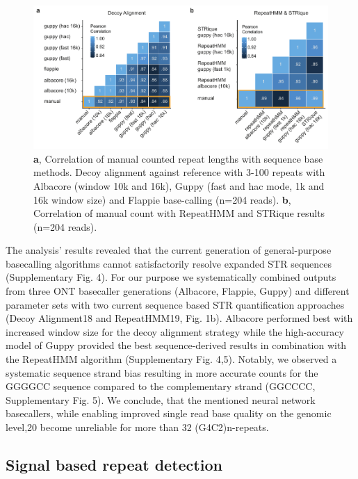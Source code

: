 \begin{figure}[h]
	\centering
	\includegraphics[width=1.0\textwidth]{figures/strique/count_sequence_corr.pdf}
	\captionsetup{format=plain}
	\caption[Correlation of sequence based STR detection methods]{\textbf{a}, Correlation of manual counted repeat lengths with sequence base methods. Decoy alignment against reference with 3-100 repeats with Albacore (window 10k and 16k), Guppy (fast and hac mode, 1k and 16k window size) and Flappie base-calling (n=204 reads). \textbf{b}, Correlation of manual count with RepeatHMM and STRique results (n=204 reads).}
	\label{fig:strique:count_sequence_corr}
\end{figure}

The analysis’ results revealed that the current generation of general-purpose basecalling algorithms cannot satisfactorily resolve expanded STR sequences (Supplementary Fig. 4). For our purpose we systematically combined outputs from three ONT basecaller generations (Albacore, Flappie, Guppy) and different parameter sets with two current sequence based STR quantification approaches (Decoy Alignment18 and RepeatHMM19, Fig. 1b). Albacore performed best with increased window size for the decoy alignment strategy while the high-accuracy model of Guppy provided the best sequence-derived results in combination with the RepeatHMM algorithm (Supplementary Fig. 4,5). Notably, we observed a systematic sequence strand bias resulting in more accurate counts for the GGGGCC sequence compared to the complementary strand (GGCCCC, Supplementary Fig. 5). We conclude, that the mentioned neural network basecallers, while enabling improved single read base quality on the genomic level,20 become unreliable for more than 32 (G4C2)n-repeats.






\subsection{Signal based repeat detection}
\label{subsec:strique:sig_repeat_counts}

